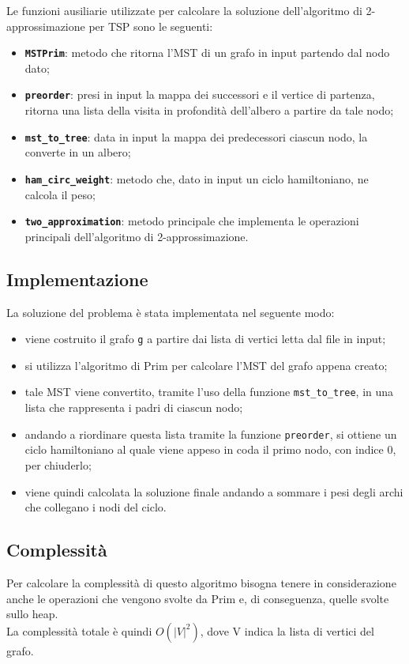 	Le funzioni ausiliarie utilizzate per calcolare la soluzione dell'algoritmo di 2-approssimazione per TSP sono le seguenti:
	\begin{itemize}
		\item \texttt{\textbf{MSTPrim}}: metodo che ritorna l'MST di un grafo in input partendo dal nodo dato; 
		\item \texttt{\textbf{preorder}}: presi in input la mappa dei successori e il vertice di partenza, ritorna una lista della visita in profondità dell'albero a partire da tale nodo; 
		\item \texttt{\textbf{mst\_to\_tree}}: data in input la mappa dei predecessori ciascun nodo, la converte in un albero; 
		\item \texttt{\textbf{ham\_circ\_weight}}: metodo che, dato in input un ciclo hamiltoniano, ne calcola il peso;
		\item \texttt{\textbf{two\_approximation}}: metodo principale che implementa le operazioni principali dell'algoritmo di 2-approssimazione.
	\end{itemize}

\subsection{Implementazione}
	
	La soluzione del problema è stata implementata nel seguente modo:
	\begin{itemize}
		\item viene costruito il grafo \texttt{g} a partire dai lista di vertici letta dal file in input;
		\item si utilizza l'algoritmo di Prim per calcolare l'MST del grafo appena creato;
		\item tale MST viene convertito, tramite l'uso della funzione \texttt{mst\_to\_tree}, in una lista che rappresenta i padri di ciascun nodo;
		\item andando a riordinare questa lista tramite la funzione \texttt{preorder}, si ottiene un ciclo hamiltoniano al quale viene appeso in coda il primo nodo, con indice 0, per chiuderlo;
		\item viene quindi calcolata la soluzione finale andando a sommare i pesi degli archi che collegano i nodi del ciclo.
	\end{itemize}
		
\subsection{Complessità}

	Per calcolare la complessità di questo algoritmo bisogna tenere in considerazione anche le operazioni che vengono svolte da Prim e, di conseguenza, quelle svolte sullo heap.\\
	La complessità totale è quindi $O(|V|^2)$, dove V indica la lista di vertici del grafo.

\pagebreak